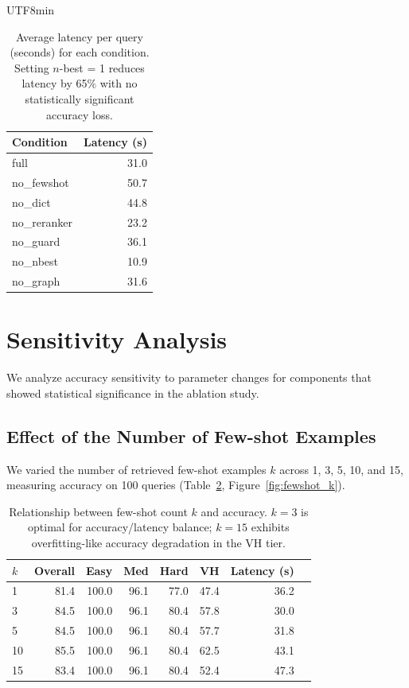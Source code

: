 \documentclass[sn-mathphys,Numbered]{sn-jnl}
\begin{document}
\begin{CJK}{UTF8}{min}
\begin{table}[t]
\centering
\caption{Average latency per query (seconds) for each condition.
Setting $n$-best = 1 reduces latency by 65\% with no statistically
significant accuracy loss.}
\label{tab:latency}
\small
\begin{tabular}{@{}lr@{}}
\toprule
Condition & Latency (s) \\
\midrule
full & 31.0 \\
no\_fewshot & 50.7 \\
no\_dict & 44.8 \\
no\_reranker & 23.2 \\
no\_guard & 36.1 \\
no\_nbest & 10.9 \\
no\_graph & 31.6 \\
\bottomrule
\end{tabular}
\end{table}

\section{Sensitivity Analysis}
\label{sec:sensitivity}

We analyze accuracy sensitivity to parameter changes for
components that showed statistical significance in the ablation study.

\subsection{Effect of the Number of Few-shot Examples}
\label{sec:fewshot_sensitivity}

We varied the number of retrieved few-shot examples $k$ across
1, 3, 5, 10, and 15, measuring accuracy on 100 queries
(Table~\ref{tab:fewshot_k}, Figure~\ref{fig:fewshot_k}).

\begin{table}[t]
\centering
\caption{Relationship between few-shot count $k$ and accuracy.
$k=3$ is optimal for accuracy/latency balance;
$k=15$ exhibits overfitting-like accuracy degradation in the VH tier.}
\label{tab:fewshot_k}
\small
\begin{tabular}{@{}lrrrrrrr@{}}
\toprule
$k$ & Overall & Easy & Med & Hard & VH & Latency (s) \\
\midrule
1  & 81.4 & 100.0 & 96.1 & 77.0 & 47.4 & 36.2 \\
3  & 84.5 & 100.0 & 96.1 & 80.4 & 57.8 & 30.0 \\
5  & 84.5 & 100.0 & 96.1 & 80.4 & 57.7 & 31.8 \\
10 & 85.5 & 100.0 & 96.1 & 80.4 & 62.5 & 43.1 \\
15 & 83.4 & 100.0 & 96.1 & 80.4 & 52.4 & 47.3 \\
\bottomrule
\end{tabular}
\end{table}


\end{CJK}
\end{document}
